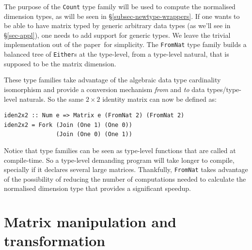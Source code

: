 \documentclass[sigplan,screen]{acmart}\settopmatter{}
\newcommand{\hs}{\texttt}
\def\doc{paper}
\begin{document}
The purpose of the \hs{Count} type family will be used to compute the normalised dimension types, as will be seen in \S\ref{subsec-newtype-wrappers}. If one wants to be able to have matrix typed by generic arbitrary data types (as we'll see in \S\ref{sec-appl}), one needs to add support for generic types. We leave the trivial implementation out of the \doc\ for simplicity. The \hs{FromNat} type family builds a balanced tree of \hs{Either}s at the type-level, from a type-level natural, that is supposed to be the matrix dimension.

These type families take advantage of the algebraic data type cardinality isomorphism and provide a conversion mechanism \emph{from} and \emph{to} data types/type-level naturals. So the same $2 \times 2$ identity matrix can now be defined as:

\vspace{1mm}
\begin{verbatim}
iden2x2 :: Num e => Matrix e (FromNat 2) (FromNat 2)
iden2x2 = Fork (Join (One 1) (One 0)) 
               (Join (One 0) (One 1))
\end{verbatim}
\vspace{1mm}

Notice that type families can be seen as type-level functions that are called at compile-time. So a type-level demanding program will take longer to compile, specially if it declares several large matrices. Thankfully, \hs{FromNat} takes advantage of the possibility of reducing the number of computations needed to calculate the normalised dimension type that provides a significant speedup.

\section{Matrix manipulation and transformation} \label{sec:200303a}
\end{document}
